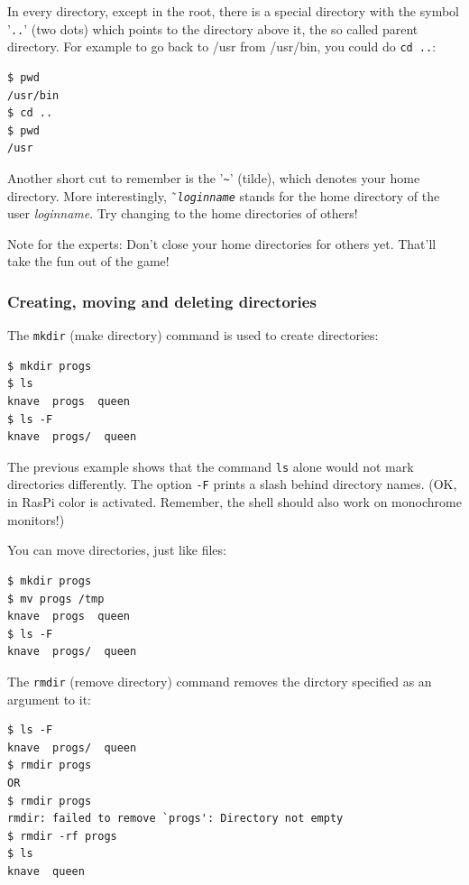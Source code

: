 \documentclass[11pt,a4paper,twoside]{article}
\begin{document}
In every directory, except in the root, there is a special directory
with the symbol '\texttt{..}' (two dots) which points to the directory
above it, the so called parent directory. For example to go back to 
/usr from /usr/bin, you could do \texttt{cd ..}:

\begin{lstlisting}[frame=single]
$ pwd
/usr/bin
$ cd ..
$ pwd
/usr
\end{lstlisting}

Another short cut to remember is the '\texttt{\~}' (tilde), which denotes
your home directory. More interestingly, \~\ \texttt{\emph{loginname}} stands 
for the home directory of the user \emph{loginname}. Try changing to the
home directories of others!

Note for the experts: Don't close your home directories for others yet. That'll
take the fun out of the game!

\subsubsection{Creating, moving and deleting directories}

The \texttt{mkdir} (make directory) command is used to create directories:

\begin{lstlisting}[frame=single]
$ mkdir progs
$ ls 
knave  progs  queen
$ ls -F
knave  progs/  queen
\end{lstlisting}

The previous example shows that the command \texttt{ls} alone would not
mark directories differently. The option \texttt{-F}
prints a slash behind directory names. (OK, in RasPi color is activated. 
Remember, the shell should also work on monochrome monitors!) 

You can move directories, just like files:
\begin{lstlisting}[frame=single]
$ mkdir progs
$ mv progs /tmp 
knave  progs  queen
$ ls -F
knave  progs/  queen
\end{lstlisting}


The \texttt{rmdir} (remove directory) command removes the dirctory specified
as an argument to it:

\begin{lstlisting}[frame=single]
$ ls -F
knave  progs/  queen
$ rmdir progs
OR 
$ rmdir progs
rmdir: failed to remove `progs': Directory not empty
$ rmdir -rf progs
$ ls
knave  queen
\end{lstlisting}
\end{document}
